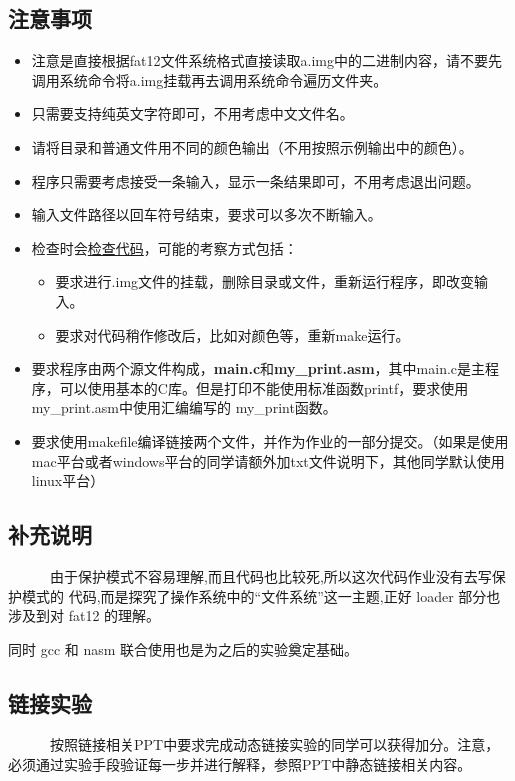 \documentclass[a4paper]{article}
\begin{document}
\subsection{注意事项}
\begin{itemize}
	\item 注意是直接根据fat12文件系统格式直接读取a.img中的二进制内容，请不要先调用系统命令将a.img挂载再去调用系统命令遍历文件夹。
	\item 只需要支持纯英文字符即可，不用考虑中文文件名。
	\item 请将目录和普通文件用不同的颜色输出（不用按照示例输出中的颜色）。
	\item 程序只需要考虑接受一条输入，显示一条结果即可，不用考虑退出问题。
	\item 输入文件路径以回车符号结束，要求可以多次不断输入。
	\item 检查时会\underline{检查代码}，可能的考察方式包括：
	\begin{itemize}
		\item 要求进行.img文件的挂载，删除目录或文件，重新运行程序，即改变输入。
		\item 要求对代码稍作修改后，比如对颜色等，重新make运行。
	\end{itemize}
	\item 要求程序由两个源文件构成，\textbf{main.c}和\textbf{my\_print.asm}，其中main.c是主程序，可以使用基本的C库。但是打印不能使用标准函数printf，要求使用my\_print.asm中使用汇编编写的
	my\_print函数。
	\item 要求使用makefile编译链接两个文件，并作为作业的一部分提交。（如果是使用mac平台或者windows平台的同学请额外加txt文件说明下，其他同学默认使用linux平台）
\end{itemize}

\subsection{补充说明}
~~~~~~由于保护模式不容易理解,而且代码也比较死,所以这次代码作业没有去写保护模式的 代码,而是探究了操作系统中的“文件系统”这一主题,正好 loader 部分也涉及到对 fat12 的理解。

同时 gcc 和 nasm 联合使用也是为之后的实验奠定基础。

\subsection{链接实验}
~~~~~~按照链接相关PPT中要求完成动态链接实验的同学可以获得加分。注意，必须通过实验手段验证每一步并进行解释，参照PPT中静态链接相关内容。
\end{document}
